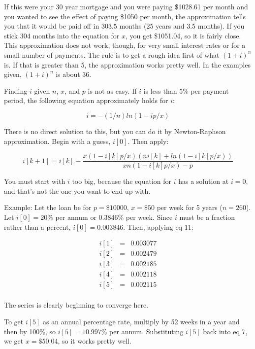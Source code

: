 If this were your 30 year mortgage and you were paying \$1028.61 per
month and you wanted to see the effect of paying \$1050 per month, the
approximation tells you that it would be paid off in $303.5$ months (25
years and 3.5 months).  If you stick 304 months into the equation for
$x$, you get \$1051.04, so it is fairly close.  This approximation does
not work, though, for very small interest rates or for a small number of
payments.  The rule is to get a rough idea first of what $(1 + i)^n$ is.
If that is greater than 5, the approximation works pretty well.  In the
examples given, $(1 + i)^n$ is about 36.

Finding $i$ given $n$, $x$, and $p$ is not as easy.  If $i$ is less than
5\% per payment period, the following equation approximately holds for
$i$:

\[ i = -(1/n) ln(1 - ip/x) \]

There is no direct solution to this, but you can do it by Newton-Raphson
approximation.  Begin with a guess, $i[0]$.  Then apply:

\[i[k+1] = i[k] -\frac{x(1 - i[k]p/x) (ni[k] + ln(1 - i[k]p/x))} {xn(1 -
  i[k]p/x) - p}\]

You must start with $i$ too big, because the equation for $i$ has a
solution at $i=0$, and that's not the one you want to end up with.

Example: Let the loan be for $p=\$10000$, $x=\$50$ per week for 5 years
($n=260$).  Let $i[0] = 20$\% per annum or 0.3846\% per week.  Since $i$
must be a fraction rather than a percent, $i[0] = 0.003846$.  Then,
applying eq 11:

\begin{eqnarray*}
  i[1]&=&0.003077\\
  i[2]&=&0.002479\\
  i[3]&=&0.002185\\
  i[4]&=&0.002118\\
  i[5]&=&0.002115\\
\end{eqnarray*}

The series is clearly beginning to converge here.

To get $i[5]$ as an annual percentage rate, multiply by 52 weeks in a
year and then by 100\%, so $i[5] = 10.997$\% per annum.  Substituting
$i[5]$ back into eq 7, we get $x = \$50.04$, so it works pretty well.

\Ref


